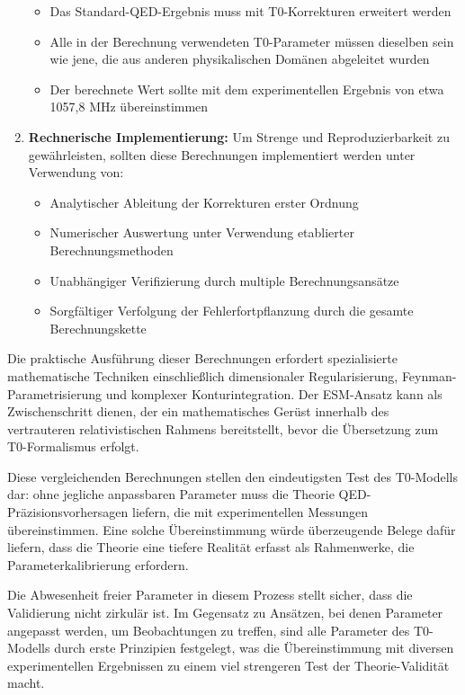 \documentclass[12pt,a4paper]{article}
\begin{document}
\begin{enumerate}
		\begin{itemize}
			\item Das Standard-QED-Ergebnis muss mit T0-Korrekturen erweitert werden
			\item Alle in der Berechnung verwendeten T0-Parameter müssen dieselben sein wie jene, die aus anderen physikalischen Domänen abgeleitet wurden
			\item Der berechnete Wert sollte mit dem experimentellen Ergebnis von etwa 1057,8 MHz übereinstimmen
		\end{itemize}
		
		\item \textbf{Rechnerische Implementierung:} Um Strenge und Reproduzierbarkeit zu gewährleisten, sollten diese Berechnungen implementiert werden unter Verwendung von:
		
		\begin{itemize}
			\item Analytischer Ableitung der Korrekturen erster Ordnung
			\item Numerischer Auswertung unter Verwendung etablierter Berechnungsmethoden
			\item Unabhängiger Verifizierung durch multiple Berechnungsansätze
			\item Sorgfältiger Verfolgung der Fehlerfortpflanzung durch die gesamte Berechnungskette
		\end{itemize}
	\end{enumerate}
	
	Die praktische Ausführung dieser Berechnungen erfordert spezialisierte mathematische Techniken einschließlich dimensionaler Regularisierung, Feynman-Parametrisierung und komplexer Konturintegration. Der ESM-Ansatz kann als Zwischenschritt dienen, der ein mathematisches Gerüst innerhalb des vertrauteren relativistischen Rahmens bereitstellt, bevor die Übersetzung zum T0-Formalismus erfolgt.
	
	Diese vergleichenden Berechnungen stellen den eindeutigsten Test des T0-Modells dar: ohne jegliche anpassbaren Parameter muss die Theorie QED-Präzisionsvorhersagen liefern, die mit experimentellen Messungen übereinstimmen. Eine solche Übereinstimmung würde überzeugende Belege dafür liefern, dass die Theorie eine tiefere Realität erfasst als Rahmenwerke, die Parameterkalibrierung erfordern.
	
	Die Abwesenheit freier Parameter in diesem Prozess stellt sicher, dass die Validierung nicht zirkulär ist. Im Gegensatz zu Ansätzen, bei denen Parameter angepasst werden, um Beobachtungen zu treffen, sind alle Parameter des T0-Modells durch erste Prinzipien festgelegt, was die Übereinstimmung mit diversen experimentellen Ergebnissen zu einem viel strengeren Test der Theorie-Validität macht.
	
\end{document}
